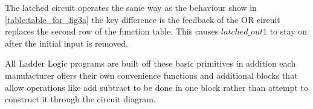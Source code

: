 The latched circuit operates the same way as the behaviour show in \ref{table:table_for_fig3a} the key difference is the feedback of the OR circuit replaces the second row of the function table. This causes $latched\_out1$ to stay on after the initial input is removed.

All Ladder Logic programs are built off these basic primitives in addition each manufacturer offers their own convenience functions and additional blocks that allow operations like add subtract to be done in one block rather than attempt to construct it through the circuit diagram.
